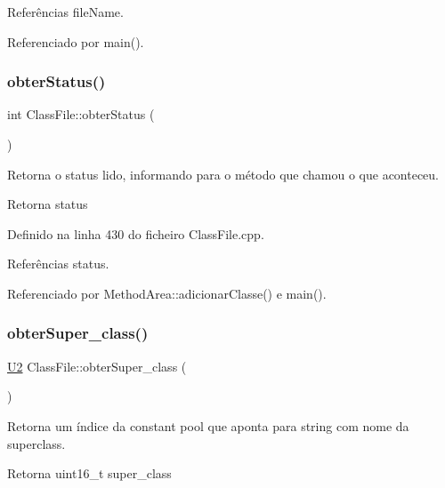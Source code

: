 Referências file\+Name.



Referenciado por main().

\mbox{\label{classClassFile_a170339cd16cf0afc0567865b3f372d38}} 
\subsubsection{\texorpdfstring{obter\+Status()}{obterStatus()}}
{\footnotesize\ttfamily int Class\+File\+::obter\+Status (\begin{DoxyParamCaption}{ }\end{DoxyParamCaption})}



Retorna o status lido, informando para o método que chamou o que aconteceu. 

\begin{DoxyReturn}{Retorna}
status 
\end{DoxyReturn}


Definido na linha 430 do ficheiro Class\+File.\+cpp.



Referências status.



Referenciado por Method\+Area\+::adicionar\+Classe() e main().

\mbox{\label{classClassFile_a8f248001f388181db10e76602031d560}} 
\subsubsection{\texorpdfstring{obter\+Super\+\_\+class()}{obterSuper\_class()}}
{\footnotesize\ttfamily \hyperlink{BasicTypes_8h_a90240657108b1b457eef9d3f76e0202e}{U2} Class\+File\+::obter\+Super\+\_\+class (\begin{DoxyParamCaption}{ }\end{DoxyParamCaption})}



Retorna um índice da constant pool que aponta para string com nome da superclass. 

\begin{DoxyReturn}{Retorna}
uint16\+\_\+t super\+\_\+class 
\end{DoxyReturn}



